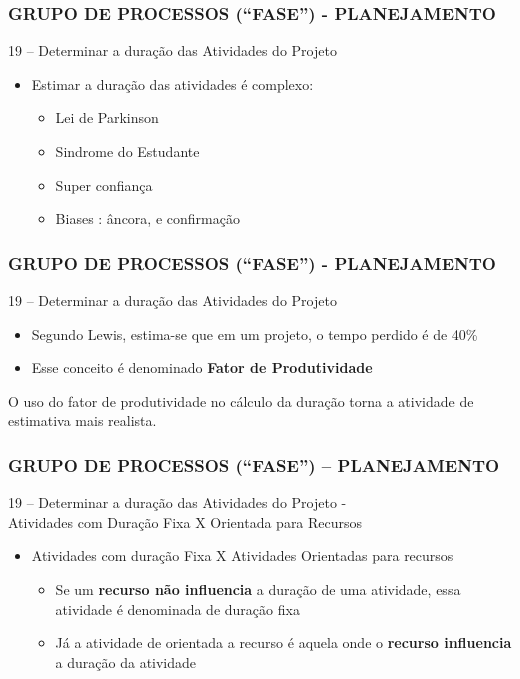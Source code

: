 \begin{frame}
 \frametitle{GRUPO DE PROCESSOS (“FASE”) - PLANEJAMENTO}
19 – Determinar a duração das Atividades do Projeto
  \begin{itemize}
   \item Estimar a duração das atividades é complexo:
   \begin{itemize}
    \item Lei de Parkinson
   \item Sindrome do Estudante
   \item Super confiança
   \item Biases : âncora, e confirmação
   \end{itemize} 
   \end{itemize} 
\end{frame}


\begin{frame}
 \frametitle{GRUPO DE PROCESSOS (“FASE”) - PLANEJAMENTO}
19 – Determinar a duração das Atividades do Projeto
  \begin{itemize}
   \item Segundo Lewis, estima-se que em um projeto, o tempo perdido é de 40\%
   \item Esse conceito é denominado \textbf{Fator de Produtividade}
  \end{itemize}
  \begin{block}{}
   O uso do fator de produtividade no cálculo da duração torna a atividade de estimativa mais realista.
  \end{block}
\end{frame}

\begin{frame}
 \frametitle{GRUPO DE PROCESSOS (“FASE”) – PLANEJAMENTO}
19 – Determinar a duração das Atividades do Projeto - \\
Atividades com Duração Fixa X Orientada para Recursos
  \begin{itemize}
   \item Atividades com duração Fixa X Atividades Orientadas para recursos
  \begin{itemize}
   \item Se um \textbf{recurso não influencia} a duração de uma atividade, essa atividade é denominada de duração fixa
   \item Já a atividade de orientada a recurso é aquela onde o \textbf{recurso influencia} a duração da atividade
  \end{itemize}
  \end{itemize}
\end{frame}

